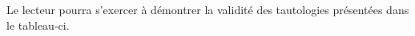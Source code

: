 \documentclass[a4paper, 12pt]{article}
\numberwithin{equation}{subsection}
\begin{document}
\FloatBarrier
Le lecteur pourra s'exercer à démontrer la validité des tautologies présentées dans le tableau-ci. \\

\end{document}
